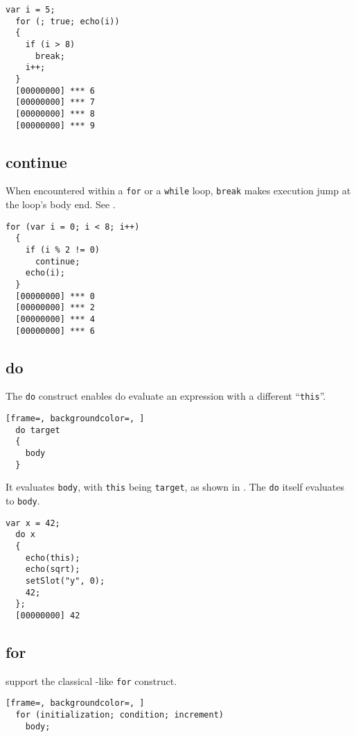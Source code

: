 \documentclass[openright,twoside,12pt]{report}
\begin{document}
\begin{lstlisting}[caption=Using break, label=lst:break,
  float=\floatpos]
  var i = 5;
  for (; true; echo(i))
  {
    if (i > 8)
      break;
    i++;
  }
  [00000000] *** 6
  [00000000] *** 7
  [00000000] *** 8
  [00000000] *** 9
\end{lstlisting}

\subsection{continue}

When encountered within a \lstinline|for| or a \lstinline|while| loop,
\lstinline|break| makes execution jump at the loop's body end. See
.

\begin{lstlisting}[caption=Using continue, label=lst:continue,
  float=\floatpos]
  for (var i = 0; i < 8; i++)
  {
    if (i % 2 != 0)
      continue;
    echo(i);
  }
  [00000000] *** 0
  [00000000] *** 2
  [00000000] *** 4
  [00000000] *** 6
\end{lstlisting}

\subsection{do}

The \lstinline|do| construct enables do evaluate an expression with a
different ``\lstinline|this|''.

\begin{lstlisting}[frame=, backgroundcolor=, ]
  do target
  {
    body
  }
\end{lstlisting}

It evaluates \lstinline|body|, with \lstinline|this| being
\lstinline|target|, as shown in .  The \lstinline|do| itself
evaluates to \lstinline|body|.

\begin{lstlisting}[caption=Using \lstinline|do|, label=lst:do,
  float=\floatpos]
  var x = 42;
  do x
  {
    echo(this);
    echo(sqrt);
    setSlot("y", 0);
    42;
  };
  [00000000] 42
\end{lstlisting}

\subsection{for}

\us support the classical \C-like \lstinline|for| construct.

\begin{lstlisting}[frame=, backgroundcolor=, ]
  for (initialization; condition; increment)
    body;
\end{lstlisting}
\end{document}
